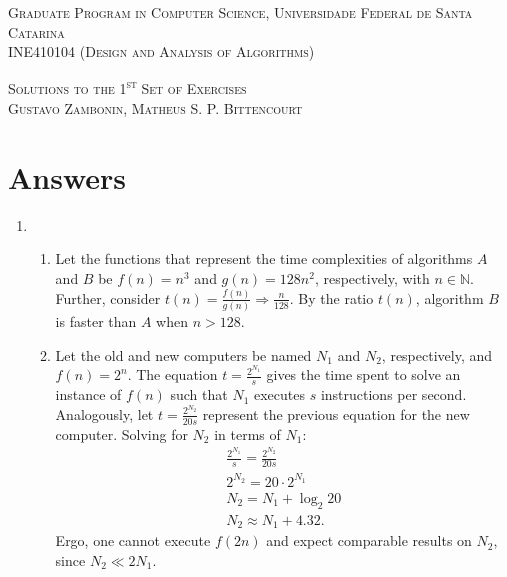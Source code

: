 \documentclass[12pt]{article}
\begin{document}
\textsc{Graduate Program in Computer Science,
  Universidade Federal de Santa Catarina} \\
\textsc{INE410104 (Design and Analysis of Algorithms)}

\textsc{Solutions to the 1\textsuperscript{st} Set of Exercises} \\
\textsc{Gustavo Zambonin, Matheus S. P. Bittencourt}

\section{Answers}

\begin{enumerate}
    \item 
    \begin{enumerate}
        \item Let the functions that represent the time complexities of algorithms $A$ and $B$ be $f(n) = n^{3}$ and $g(n) = 128n^{2}$, respectively, with $n \in \mathbb{N}$. Further, consider $t(n) = \frac{f(n)}{g(n)} \Rightarrow \frac{n}{128}$. By the ratio $t(n)$, algorithm $B$ is faster than $A$ when $n > 128$.
        \item Let the old and new computers be named $N_{1}$ and $N_{2}$, respectively, and $f(n) = 2^{n}$. The equation $t = \frac{2^{N_{1}}}{s}$ gives the time spent to solve an instance of $f(n)$ such that $N_{1}$ executes $s$ instructions per second. Analogously, let $t = \frac{2^{N_{2}}}{20s}$ represent the previous equation for the new computer. Solving for $N_{2}$ in terms of $N_{1}$:
        \begin{align*}
            \frac{2^{N_{1}}}{s} = \frac{2^{N_{2}}}{20s} \\
            2^{N_{2}} = 20 \cdot 2^{N_{1}} \\
            N_{2} = N_{1} + \log_{2} 20 \\
            N_{2} \approx N_{1} + 4.32.
        \end{align*}
        Ergo, one cannot execute $f(2n)$ and expect comparable results on $N_{2}$, since $N_{2} \ll 2 N_{1}$.
        
        

\end{enumerate}
\end{enumerate}
\end{document}
